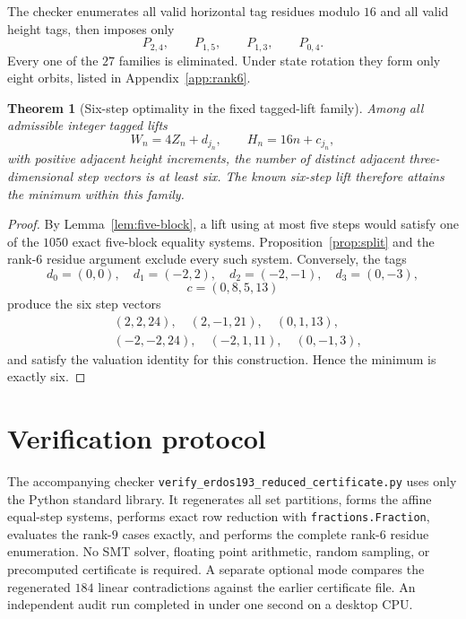 \documentclass[11pt]{article}
\newtheorem{theorem}{Theorem}
\newcommand{\PPair}[2]{P_{#1,#2}}
\begin{document}
The checker enumerates all valid horizontal tag residues modulo $16$ and all
valid height tags, then imposes only
\begin{equation}\label{eq:four-pairs}
\PPair{2}{4},\qquad \PPair{1}{5},\qquad \PPair{1}{3},\qquad \PPair{0}{4}.
\end{equation}
Every one of the $27$ families is eliminated. Under state rotation they form
only eight orbits, listed in Appendix~\ref{app:rank6}.

\begin{theorem}[Six-step optimality in the fixed tagged-lift family]
Among all admissible integer tagged lifts
\[
W_n=4Z_n+d_{j_n},\qquad H_n=16n+c_{j_n},
\]
with positive adjacent height increments, the number of distinct adjacent
three-dimensional step vectors is at least six. The known six-step lift
therefore attains the minimum within this family.
\end{theorem}
\begin{proof}
By Lemma~\ref{lem:five-block}, a lift using at most five steps would satisfy one
of the $1050$ exact five-block equality systems. Proposition~\ref{prop:split}
and the rank-$6$ residue argument exclude every such system. Conversely, the
tags
\[
d_0=(0,0),\quad d_1=(-2,2),\quad d_2=(-2,-1),\quad d_3=(0,-3),
\]
\[
c=(0,8,5,13)
\]
produce the six step vectors
\[
\begin{split}
&(2,2,24),\quad (2,-1,21),\quad (0,1,13),\\
&(-2,-2,24),\quad (-2,1,11),\quad (0,-1,3),
\end{split}
\]
and satisfy the valuation identity for this construction. Hence the minimum is
exactly six.
\end{proof}

\section{Verification protocol}
The accompanying checker \texttt{verify\_erdos193\_reduced\_certificate.py}
uses only the Python standard library. It regenerates all set partitions,
forms the affine equal-step systems, performs exact row reduction with
\texttt{fractions.Fraction}, evaluates the rank-$9$ cases exactly, and performs
the complete rank-$6$ residue enumeration. No SMT solver, floating point
arithmetic, random sampling, or precomputed certificate is required. A separate
optional mode compares the regenerated $184$ linear contradictions against the
earlier certificate file. An independent audit run completed in under one
second on a desktop CPU.
\end{document}

